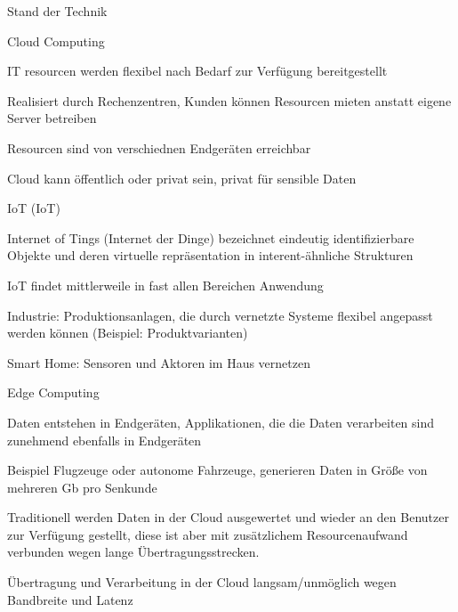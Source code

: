 \begin{notes}
\item Stand der Technik
    \begin{notes}
        \item Cloud Computing
        \begin{notes}
            \item IT resourcen werden flexibel nach Bedarf zur Verfügung bereitgestellt
            \item Realisiert durch Rechenzentren, Kunden können Resourcen mieten anstatt eigene Server betreiben
            \item Resourcen sind von verschiednen Endgeräten erreichbar \cite{Sunyaev2020}
            \item Cloud kann öffentlich oder privat sein, privat für sensible Daten \cite{Ibrahim2021}
        \end{notes}
        \item \gls{IoT} (IoT) 
        \begin{notes}
            \item Internet of Tings (Internet der Dinge) bezeichnet eindeutig identifizierbare Objekte und deren virtuelle repräsentation in interent-ähnliche Strukturen\cite{Jie2013} 
            \item IoT findet mittlerweile in fast allen Bereichen Anwendung
            \item Industrie: Produktionsanlagen, die durch vernetzte Systeme flexibel angepasst werden können (Beispiel: Produktvarianten)
            \item Smart Home: Sensoren und Aktoren im Haus vernetzen \cite{Wortmann2015}
        \end{notes}
        \item Edge Computing
        \begin{notes}
            \item Daten entstehen in Endgeräten, Applikationen, die die Daten verarbeiten sind zunehmend ebenfalls in Endgeräten
            \item Beispiel Flugzeuge oder autonome Fahrzeuge, generieren Daten in Größe von mehreren Gb pro Senkunde \cite{Liu2019}
            \item Traditionell werden Daten in der Cloud ausgewertet und wieder an den Benutzer zur Verfügung gestellt, diese ist aber mit zusätzlichem Resourcenaufwand verbunden wegen lange Übertragungsstrecken. \cite{Perez2022} 
            \item Übertragung und Verarbeitung in der Cloud langsam/unmöglich wegen Bandbreite und Latenz

\end{notes}
\end{notes}
\end{notes}
